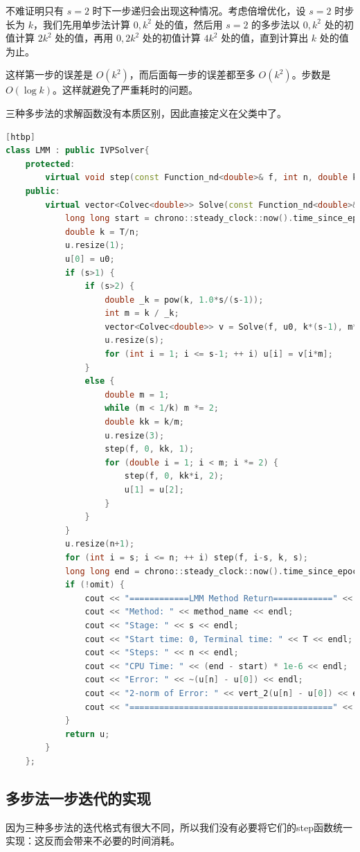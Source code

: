 \documentclass{ctexart}
\begin{document}
不难证明只有 $s=2$ 时下一步递归会出现这种情况。考虑倍增优化，设 $s=2$ 时步长为 $k$，我们先用单步法计算 $0,k^2$ 处的值，然后用 $s=2$ 的多步法以 $0,k^2$ 处的初值计算 $2k^2$ 处的值，再用 $0,2k^2$ 处的初值计算 $4k^2$ 处的值，直到计算出 $k$ 处的值为止。

这样第一步的误差是 $O(k^2)$，而后面每一步的误差都至多 $O(k^2)$。步数是 $O(\log k)$。这样就避免了严重耗时的问题。

三种多步法的求解函数没有本质区别，因此直接定义在父类中了。

\begin{lstlisting}[language=c++][htbp]
class LMM : public IVPSolver{
	protected:
		virtual void step(const Function_nd<double>& f, int n, double k, int s) = 0;
	public:
		virtual vector<Colvec<double>> Solve(const Function_nd<double>& f, const Colvec<double>& u0, double T, int n, int s = 0, bool omit = 0) {
			long long start = chrono::steady_clock::now().time_since_epoch().count();
			double k = T/n;
			u.resize(1);
			u[0] = u0;
			if (s>1) {
				if (s>2) {
					double _k = pow(k, 1.0*s/(s-1));
					int m = k / _k;
					vector<Colvec<double>> v = Solve(f, u0, k*(s-1), m*(s-1), s-1, 1);
					u.resize(s);
					for (int i = 1; i <= s-1; ++ i) u[i] = v[i*m];
				}
				else {
					double m = 1;
					while (m < 1/k) m *= 2;
					double kk = k/m;
					u.resize(3);
					step(f, 0, kk, 1);
					for (double i = 1; i < m; i *= 2) {
						step(f, 0, kk*i, 2);
						u[1] = u[2];
					}
				}
			}
			u.resize(n+1);
			for (int i = s; i <= n; ++ i) step(f, i-s, k, s);
			long long end = chrono::steady_clock::now().time_since_epoch().count();
			if (!omit) {
				cout << "============LMM Method Return============" << endl;
				cout << "Method: " << method_name << endl;
				cout << "Stage: " << s << endl;
				cout << "Start time: 0, Terminal time: " << T << endl;
				cout << "Steps: " << n << endl;
				cout << "CPU Time: " << (end - start) * 1e-6 << endl;
				cout << "Error: " << ~(u[n] - u[0]) << endl;
				cout << "2-norm of Error: " << vert_2(u[n] - u[0]) << endl;
				cout << "=========================================" << endl;
			}
			return u;
		}
	};
\end{lstlisting}

\subsection{多步法一步迭代的实现}

因为三种多步法的迭代格式有很大不同，所以我们没有必要将它们的step函数统一实现：这反而会带来不必要的时间消耗。
\end{document}
